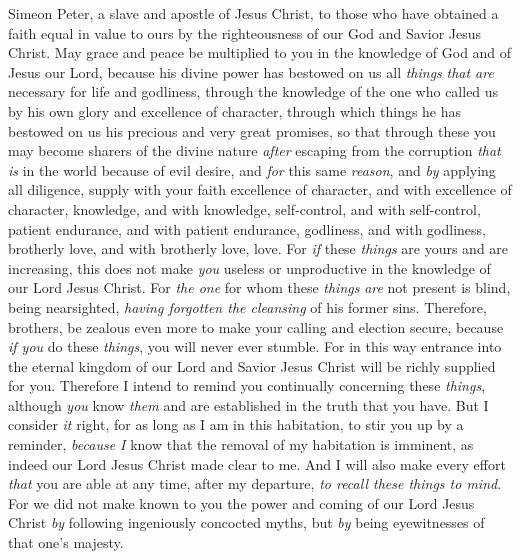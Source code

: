 
\begin{biblechapter} %
 Simeon Peter, a slave and apostle of Jesus Christ, to those who have obtained a faith equal in value to ours by the righteousness of our God and Savior Jesus Christ.
\verse May grace and peace be multiplied to you in the knowledge of God and of Jesus our Lord,
\verse because his divine power has bestowed on us all \textit{things} \textit{that are} necessary for life and godliness, through the knowledge of the one who called us by his own glory and excellence of character,
\verse through which things he has bestowed on us his precious and very great promises, so that through these you may become sharers of the divine nature \textit{after} escaping from the corruption \textit{that is} in the world because of evil desire,
\verse and \textit{for} this same \textit{reason}, and \textit{by} applying all diligence, supply with your faith excellence of character, and with excellence of character, knowledge,
\verse and with knowledge, self-control, and with self-control, patient endurance, and with patient endurance, godliness,
\verse and with godliness, brotherly love, and with brotherly love, love.
 For \textit{if} these \textit{things} are yours and are increasing, this does not make \textit{you} useless or unproductive in the knowledge of our Lord Jesus Christ.
\verse For \textit{the one} for whom these \textit{things} \textit{are} not present is blind, being nearsighted, \textit{having forgotten the cleansing} of his former sins.
\verse Therefore, brothers, be zealous even more to make your calling and election secure, because \textit{if you} do these \textit{things}, you will never ever stumble.
\verse For in this way entrance into the eternal kingdom of our Lord and Savior Jesus Christ will be richly supplied for you.
\verse Therefore I intend to remind you continually concerning these \textit{things}, although \textit{you} know \textit{them} and are established in the truth that you have.
\verse But I consider \textit{it} right, for as long as I am in this habitation, to stir you up by a reminder,
\verse \textit{because I} know that the removal of my habitation is imminent, as indeed our Lord Jesus Christ made clear to me.
\verse And I will also make every effort \textit{that} you are able at any time, after my departure, \textit{to recall these things to mind}.
 For we did not make known to you the power and coming of our Lord Jesus Christ \textit{by} following ingeniously concocted myths, but \textit{by} being eyewitnesses of that one’s majesty.

\end{biblechapter}
